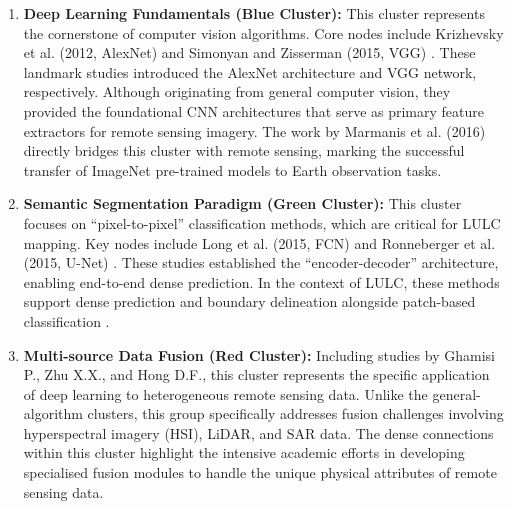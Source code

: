 \documentclass[]{interact}
\theoremstyle{plain}%
\theoremstyle{definition}
\theoremstyle{remark}
\DeclareRobustCommand{\DIFadd}[1]{{\protect\color{DIFaddcolor}\uwave{#1}}}
\DeclareRobustCommand{\DIFdel}[1]{{\protect\color{DIFdelcolor}\sout{#1}}}
\def\DIFadd#1{#1}%
\def\DIFdel#1{}%
\begin{document}
\begin{enumerate}
	\item \textbf{Deep Learning Fundamentals (Blue Cluster):} This cluster represents the cornerstone of computer vision algorithms. Core nodes include Krizhevsky et al. (2012, AlexNet) and Simonyan \DIFdel{et} \DIFdel{al}\DIFdel{.} \DIFadd{and} \DIFadd{Zisserman} (2015, VGG) \citep{31, 32}. These landmark studies introduced the AlexNet architecture and VGG network, respectively. Although originating from general computer vision, they provided the foundational CNN architectures that serve as primary feature extractors for remote sensing imagery. The \DIFdel{highly} \DIFdel{cited} work by Marmanis et al. (2016) directly bridges this cluster with remote sensing, marking the successful transfer of ImageNet pre-trained models to Earth observation tasks.
	
	\item \textbf{Semantic Segmentation Paradigm (Green Cluster):} This cluster focuses on ``pixel-to-pixel'' classification methods, which are critical for LULC mapping. Key nodes include Long et al. (2015, FCN) {\hypersetup{citecolor=red}\color{red}\citep{ORIG33} } {\color{blue}\citep{33} }and Ronneberger et al. (2015, U-Net) \citep{34}. These studies established the ``encoder-decoder'' architecture, enabling end-to-end dense prediction. In the context of LULC, \DIFdel{this} \DIFdel{paradigm} \DIFdel{shifted} \DIFdel{the} \DIFdel{research} \DIFdel{focus} \DIFdel{from} \DIFadd{these} \DIFadd{methods} \DIFadd{support} \DIFadd{dense} \DIFadd{prediction} \DIFadd{and} \DIFadd{boundary} \DIFadd{delineation} \DIFadd{alongside} patch-based classification \DIFdel{to} \DIFdel{precise} \DIFdel{boundary} \DIFdel{delineation}.
	
	\item \textbf{Multi-source Data Fusion (Red Cluster):} \DIFdel{Dominated} \DIFadd{Including} \DIFadd{studies} by \DIFdel{scholars} \DIFdel{such} \DIFdel{as} Ghamisi P., Zhu X.X., and Hong D.F., this cluster represents the specific application of deep learning to heterogeneous remote sensing data. \DIFdel{This} \DIFdel{lineage} \DIFdel{originates} \DIFdel{from} \DIFdel{classical} \DIFdel{statistical} \DIFdel{modeling} \DIFdel{of} \DIFdel{sensor} \DIFdel{physics} \DIFdel{and} \DIFdel{the} \DIFdel{establishment} \DIFdel{of} \DIFdel{rigorous} \DIFdel{evaluation} \DIFdel{frameworks} \DIFdel{for} \DIFdel{pixel-level} \DIFdel{fusion} {\hypersetup{citecolor=red}\color{red}\citep{ORIG58}}\DIFdel{.} Unlike the general-algorithm clusters, this group specifically addresses fusion challenges involving \DIFdel{Hyperspectral} \DIFadd{hyperspectral} \DIFadd{imagery} (HSI), LiDAR, and SAR data. The dense connections within this cluster highlight the intensive academic efforts in developing \DIFdel{specialized} \DIFadd{specialised} fusion modules to handle the unique physical attributes of remote sensing data.
	

\end{enumerate}
\end{document}
